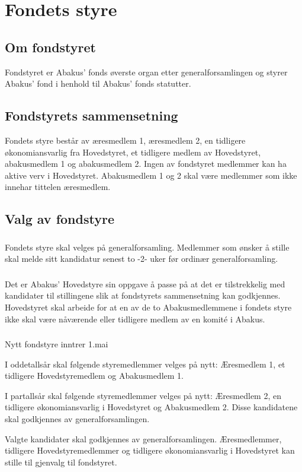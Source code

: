 \section{Fondets styre}
\subsection{Om fondstyret}
Fondstyret er Abakus’ fonds øverste organ etter generalforsamlingen og styrer
Abakus’ fond i henhold til Abakus’ fonds statutter.

\subsection{Fondstyrets sammensetning}
Fondets styre består av æresmedlem 1, æresmedlem 2, en tidligere økonomiansvarlig fra 
Hovedstyret, et tidligere medlem av Hovedstyret, abakusmedlem 1 og abakusmedlem 2.
Ingen av fondstyret medlemmer kan ha aktive verv i Hovedstyret. Abakusmedlem 1 og 2 skal 
være medlemmer som ikke innehar tittelen æresmedlem. 

\subsection{Valg av fondstyre}
\subsubsection{}
Fondets styre skal velges på generalforsamling. Medlemmer som ønsker å stille skal melde 
sitt kandidatur senest to -2- uker før ordinær generalforsamling. 

\subsubsection{}
Det er Abakus’ Hovedstyre sin oppgave å passe på at det er tilstrekkelig med kandidater til 
stillingene slik at fondstyrets sammensetning kan godkjennes. Hovedstyret skal arbeide for 
at en av de to Abakusmedlemmene i fondets styre ikke skal være nåværende eller tidligere 
medlem av en komité i Abakus.

\subsubsection{}
Nytt fondstyre inntrer 1.mai

I oddetallsår skal følgende styremedlemmer velges på nytt: Æresmedlem 1, et tidligere 
Hovedstyremedlem og Abakusmedlem 1. 

I partallsår skal følgende styremedlemmer velges på nytt: Æresmedlem 2, en tidligere 
økonomiansvarlig i Hovedstyret og Abakusmedlem 2. 
Disse kandidatene skal godkjennes av generalforsamlingen. 

Valgte kandidater skal godkjennes av generalforsamlingen. Æresmedlemmer,
tidligere Hovedstyremedlemmer og tidligere økonomiansvarlig i Hovedstyret kan
stille til gjenvalg til fondstyret.
